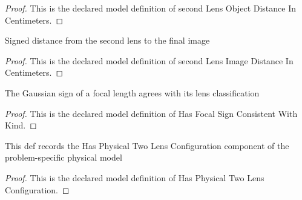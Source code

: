 \begin{proof}
  This is the declared model definition of second Lens Object Distance In Centimeters.
\end{proof}
\begin{definition}
  \label{def:physics:phyx-mini-0148:phyxminiproblems-problemphyxmini0148-secondlensimagedistanceincentimeters}
  Signed distance from the second lens to the final image
\end{definition}
\begin{proof}
  This is the declared model definition of second Lens Image Distance In Centimeters.
\end{proof}
\begin{definition}
  \label{def:physics:phyx-mini-0148:phyxminiproblems-problemphyxmini0148-hasfocalsignconsistentwithkind}
  The Gaussian sign of a focal length agrees with its lens classification
\end{definition}
\begin{proof}
  This is the declared model definition of Has Focal Sign Consistent With Kind.
\end{proof}
\begin{definition}
  \label{def:physics:phyx-mini-0148:phyxminiproblems-problemphyxmini0148-hasphysicaltwolensconfiguration}
  This def records the Has Physical Two Lens Configuration component of the problem-specific physical model
\end{definition}
\begin{proof}
  This is the declared model definition of Has Physical Two Lens Configuration.
\end{proof}
